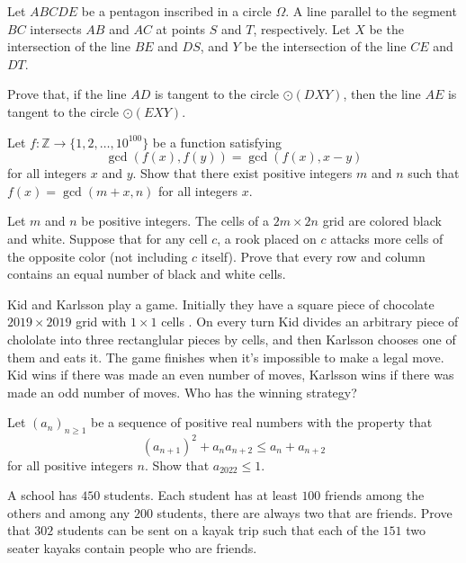 \documentclass[11pt]{scrartcl}
\begin{document}
\begin{problem}[5867489266334805897]
	Let $ABCDE$ be a pentagon inscribed in a circle $\Omega$. A line parallel to the segment $BC$ intersects $AB$ and $AC$ at points $S$ and $T$, respectively. Let $X$ be the intersection of the line $BE$ and $DS$, and $Y$ be the intersection of the line $CE$ and $DT$.

Prove that, if the line $AD$ is tangent to the circle $\odot(DXY)$, then the line $AE$ is tangent to the circle $\odot(EXY)$.
\end{problem}
\begin{problem}[461803484803557]
	Let $f: \mathbb Z\to \{1, 2, \dots, 10^{100}\}$ be a function satisfying
$$\gcd(f(x), f(y)) = \gcd(f(x), x-y)$$for all integers $x$ and $y$. Show that there exist positive integers $m$ and $n$ such that $f(x) = \gcd(m+x, n)$ for all integers $x$.
\end{problem}
\begin{problem}[855628849330783]
  Let $m$ and $n$ be positive integers.
  The cells of a $2m \times 2n$ grid are colored black and white.
  Suppose that for any cell $c$, a rook placed on $c$ attacks
  more cells of the opposite color (not including $c$ itself).
  Prove that every row and column contains
  an equal number of black and white cells.
\end{problem}
\begin{problem}[300334293164389]
	Kid and Karlsson play a game. Initially they have a square piece of chocolate $2019\times 2019$ grid with $1\times 1$ cells . On every turn Kid divides an arbitrary piece of chololate into three rectanglular pieces by cells, and then Karlsson chooses one of them and eats it. The game finishes when it's impossible to make a legal move. Kid wins if there was made an even number of moves, Karlsson wins if there was made an odd number of moves.
Who has the winning strategy?
\end{problem}
\begin{problem}[633974672407561]
Let $(a_n)_{n\geq 1}$ be a sequence of positive real numbers with the property that
$$(a_{n+1})^2 + a_na_{n+2} \leq a_n + a_{n+2}$$for all positive integers $n$. Show that $a_{2022}\leq 1$.
\end{problem}
\begin{problem}[8005762280394288133]
A school has $450$ students. Each student has at least $100$ friends among the others and among any $200$ students, there are always two that are friends. Prove that $302$ students can be sent on a kayak trip such that each of the $151$ two seater kayaks contain people who are friends.
\end{problem}
\end{document}
